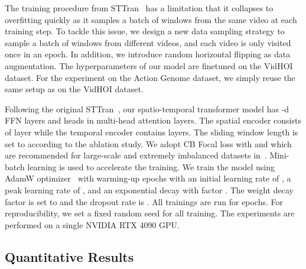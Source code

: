 \documentclass[times,twocolumn,final,authoryear]{elsarticle}
\begin{document}
The training procedure from STTran~\citep{hoi_v2:sttran} has a limitation that it collapses to overfitting quickly as it samples a batch of windows from the same video at each training step. To tackle this issue, we design a new data sampling strategy to sample a batch of windows from different videos, and each video is only visited once in an epoch. In addition, we introduce random horizontal flipping as data augmentation. The hyperparameters of our model are finetuned on the VidHOI dataset. For the experiment on the Action Genome dataset, we simply reuse the same setup as on the VidHOI dataset. 

Following the original STTran~\citep{hoi_v2:sttran}, our spatio-temporal transformer model has -d FFN layers and  heads in multi-head attention layers. The spatial encoder consists of  layer while the temporal encoder contains  layers. The sliding window length is set to  according to the ablation study. We adopt CB Focal loss with  and  which are recommended for large-scale and extremely imbalanced datasets in~\citep{loss:cb}. Mini-batch learning is used to accelerate the training. We train the model using AdamW optimizer~\citep{optimizer:adamw} with  warming-up epochs with an initial learning rate of , a peak learning rate of , and an exponential decay with factor . The weight decay factor is set to  and the dropout rate is . All trainings are run for  epochs. For reproducibility, we set a fixed random seed for all training. The experiments are performed on a single NVIDIA RTX 4090 GPU.

\subsection{Quantitative Results}
\end{document}
